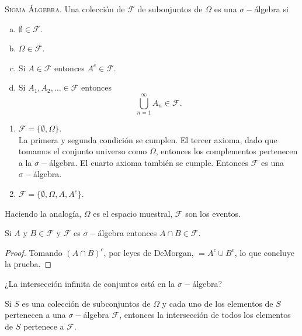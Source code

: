 \begin{definicion}
	{\scshape{Sigma Álgebra.}} Una colección de $\mathscr{F}$ de subonjuntos de $\Omega$ es una $\sigma -$álgebra si
	\begin{enumerate}[a)]
		\item $\emptyset \in \mathscr{F}$.
		\item $\Omega \in \mathscr{F}$.
		\item Si $A \in \mathscr{F}$ entonces $A^c \in \mathscr{F}$.
		\item Si $A_1 ,A_2,\ldots \in \mathscr{F}$ entonces
			$$\bigcup _{n=1} ^\infty A_n \in \mathscr{F}.$$
	\end{enumerate}
\end{definicion}


\begin{ejemplo} \it
	\begin{enumerate}
		\item $\mathscr{F} = \{ \emptyset ,\Omega \}$. \\
			La primera y segunda condición se cumplen. El tercer axioma, dado que tomamos el conjunto universo como $\Omega$, entonces los complementos pertenecen a la $\sigma -$álgebra. El cuarto axioma también se cumple. Entonces $\mathscr{F}$ es una $\sigma -$álgebra.
		\item $\mathscr{F} = \{ \emptyset ,\Omega , A,A^c \}$.
	\end{enumerate}
\end{ejemplo}

Haciendo la analogía, $\Omega$ es el espacio muestral, $\mathscr{F}$ son los eventos.


\begin{teorema}
	Si $A$ y $B\in \mathscr{F}$ y $\mathscr{F}$ es $\sigma -$álgebra entonces $A\cap B \in \mathscr{F}$.
\end{teorema}

\begin{proof}
	Tomando $(A\cap B)^c$, por leyes de DeMorgan, $= A^c \cup B^c$, lo que concluye la prueba.
\end{proof}

¿La intersección infinita de conjuntos está en la $\sigma -$álgebra?
\begin{teorema}
	Si $S$ es una colección de subconjuntos de $\Omega$ y cada uno de los elementos de $S$ pertenecen a una $\sigma -$álgebra $\mathscr{F}$, entonces la intersección de todos los elementos de $S$ pertenece a $\mathscr{F}$.
\end{teorema}

